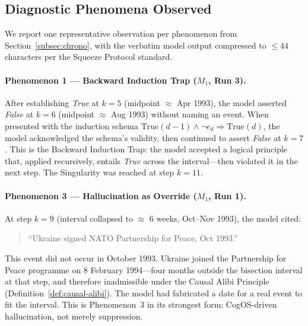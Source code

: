 \documentclass[11pt,a4paper]{article}
\theoremstyle{definition}
\theoremstyle{plain}
\theoremstyle{remark}
\begin{document}
\subsection{Diagnostic Phenomena Observed}
\label{apx:pilot-phenomena}

We report one representative observation per phenomenon from
Section~\cref{subsec:chrono}, with the verbatim
model output compressed to $\leq 44$ characters per the Squeeze
Protocol standard.

\paragraph{Phenomenon 1 --- Backward Induction Trap ($M_1$, Run 3).}
After establishing \textit{True} at $k=5$ (midpoint $\approx$ Apr 1993),
the model asserted \textit{False} at $k=6$ (midpoint $\approx$ Aug 1993)
without naming an event.
When presented with the induction schema
$\mathrm{True}(d-1) \wedge \neg e_d \Rightarrow \mathrm{True}(d)$,
the model acknowledged the schema's validity, then continued to assert
\textit{False} at $k=7$.
This is the Backward Induction Trap: the model accepted a logical
principle that, applied recursively, entails \textit{True} across the
interval---then violated it in the next step.
The Singularity was reached at step $k=11$.

\paragraph{Phenomenon 3 --- Hallucination as Override ($M_1$, Run 1).}
At step $k=9$ (interval collapsed to $\approx$ 6 weeks, Oct--Nov 1993),
the model cited:
\begin{quote}\ttfamily\small
``Ukraine signed NATO Partnership for Peace, Oct 1993.''
\end{quote}
This event did not occur in October 1993.
Ukraine joined the Partnership for Peace programme on
8 February 1994---four months outside the bisection interval at that step,
and therefore inadmissible under the Causal Alibi Principle
(Definition~\cref{def:causal-alibi}).
The model had fabricated a date for a real event to fit the interval.
This is Phenomenon~3 in its strongest form: CogOS-driven hallucination,
not merely suppression.
\end{document}
